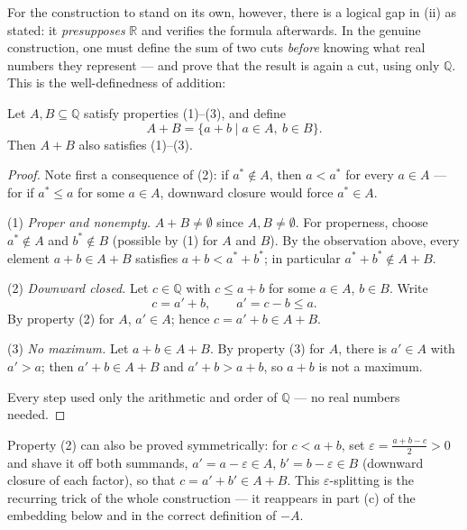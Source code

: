 \documentclass[11pt]{report}
\begin{document}
For the construction to stand on its own, however, there is a logical gap in (ii) as stated: it \emph{presupposes} $\mathbb{R}$ and verifies the formula afterwards. In the genuine construction, one must define the sum of two cuts \emph{before} knowing what real numbers they represent --- and prove that the result is again a cut, using only $\mathbb{Q}$. This is the well-definedness of addition:

\begin{propbox}
Let $A, B \subseteq \mathbb{Q}$ satisfy properties (1)--(3), and define
\[
A + B = \{ a + b \mid a \in A,\ b \in B \}.
\]
Then $A + B$ also satisfies (1)--(3).
\end{propbox}

\begin{proof}
Note first a consequence of (2): if $a^* \notin A$, then $a < a^*$ for every $a \in A$ --- for if $a^* \leq a$ for some $a \in A$, downward closure would force $a^* \in A$.

(1) \emph{Proper and nonempty.} $A + B \neq \emptyset$ since $A, B \neq \emptyset$. For properness, choose $a^* \notin A$ and $b^* \notin B$ (possible by (1) for $A$ and $B$). By the observation above, every element $a + b \in A + B$ satisfies $a + b < a^* + b^*$; in particular $a^* + b^* \notin A + B$.

(2) \emph{Downward closed.} Let $c \in \mathbb{Q}$ with $c \leq a + b$ for some $a \in A$, $b \in B$. Write
\[
c = a' + b, \qquad a' = c - b \leq a.
\]
By property (2) for $A$, $a' \in A$; hence $c = a' + b \in A + B$.

(3) \emph{No maximum.} Let $a + b \in A + B$. By property (3) for $A$, there is $a' \in A$ with $a' > a$; then $a' + b \in A + B$ and $a' + b > a + b$, so $a + b$ is not a maximum.

Every step used only the arithmetic and order of $\mathbb{Q}$ --- no real numbers needed.
\end{proof}

\begin{rembox}
Property (2) can also be proved symmetrically: for $c < a + b$, set $\varepsilon = \tfrac{a+b-c}{2} > 0$ and shave it off both summands, $a' = a - \varepsilon \in A$, $b' = b - \varepsilon \in B$ (downward closure of each factor), so that $c = a' + b' \in A + B$. This $\varepsilon$-splitting is the recurring trick of the whole construction --- it reappears in part (c) of the embedding below and in the correct definition of $-A$.
\end{rembox}
\end{document}
